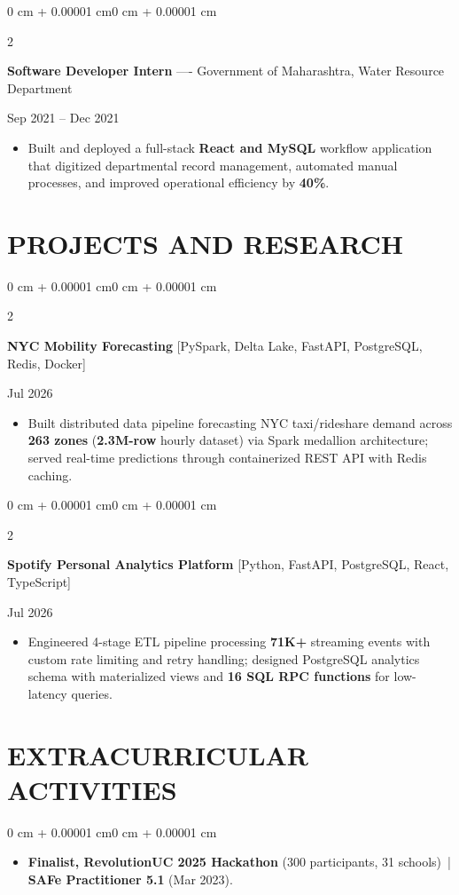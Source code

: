 \documentclass[10pt, letterpaper]{article}
\newenvironment{highlights}{
    \begin{itemize}[
        topsep=0.10 cm,
        parsep=0.06 cm,
        partopsep=0pt,
        itemsep=0.06 cm,
        leftmargin=12pt
    ]
}{
    \end{itemize}
}
\newenvironment{onecolentry}{
    \begin{adjustwidth}{0 cm + 0.00001 cm}{0 cm + 0.00001 cm}
}{
    \end{adjustwidth}
}
\newenvironment{twocolentry}[2][]{
    \onecolentry
    \def\secondColumn{#2}
    \setcolumnwidth{\fill, 4.5 cm}
    \begin{paracol}{2}
}{
    \switchcolumn \raggedleft \secondColumn
    \end{paracol}
    \endonecolentry
}
\begin{document}
\begin{twocolentry}{Sep 2021 -- Dec 2021}
\textbf{Software Developer Intern} ---- Government of Maharashtra, Water Resource Department
\end{twocolentry}
\begin{highlights}
  \item Built and deployed a full-stack \textbf{React and MySQL} workflow application that digitized departmental record management, automated manual processes, and improved operational efficiency by \textbf{40\%}.
\end{highlights}

\section{PROJECTS AND RESEARCH}
\begin{twocolentry}{Jul 2026}
\textbf{NYC Mobility Forecasting} [PySpark, Delta Lake, FastAPI, PostgreSQL, Redis, Docker]
\end{twocolentry}
\begin{highlights}
  \item Built distributed data pipeline forecasting NYC taxi/rideshare demand across \textbf{263 zones} (\textbf{2.3M-row} hourly dataset) via Spark medallion architecture; served real-time predictions through containerized REST API with Redis caching.
\end{highlights}

\vspace{0.12 cm}

\begin{twocolentry}{Jul 2026}
\textbf{Spotify Personal Analytics Platform} [Python, FastAPI, PostgreSQL, React, TypeScript]
\end{twocolentry}
\begin{highlights}
  \item Engineered 4-stage ETL pipeline processing \textbf{71K+} streaming events with custom rate limiting and retry handling; designed PostgreSQL analytics schema with materialized views and \textbf{16 SQL RPC functions} for low-latency queries.
\end{highlights}

\section{EXTRACURRICULAR ACTIVITIES}
\begin{onecolentry}
\begin{highlights}
  \item \textbf{Finalist, RevolutionUC 2025 Hackathon} (300 participants, 31 schools) \,|\, \textbf{SAFe Practitioner 5.1} (Mar 2023).
\end{highlights}
\end{onecolentry}
\end{document}
